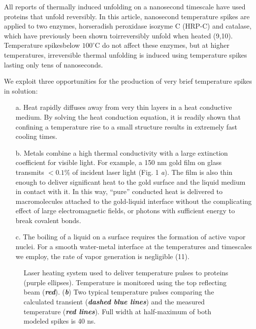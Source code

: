 \documentclass{biophys_letter}
\begin{document}
\begin{multicols}{2}
All reports of thermally induced unfolding on a nanosecond timescale have used proteins that unfold reversibly. In this article, nanosecond temperature spikes are applied to two enzymes, horseradish peroxidase isozyme C (HRP-C) and catalase, which have previously been shown to\break irreversibly unfold when heated (9,10). Temperature spikes\break below $100^\circ$C do not affect these enzymes, but at higher temperatures, irreversible thermal unfolding is induced using temperature spikes lasting only tens of nanoseconds.

We exploit three opportunities for the production of very brief temperature spikes in solution:
\begin{itemize}
\item[a.] Heat rapidly diffuses away from very thin layers in a heat conductive medium. By solving the heat conduction equation, it is readily shown that confining a temperature rise to a small structure results in extremely fast cooling times.

\item[b.] Metals combine a high thermal conductivity with a large extinction coefficient for visible light. For example, a 150 nm gold film on glass transmits $<0.1\%$ of incident laser light (Fig. 1 {\it a}). The film is also thin enough to deliver significant heat to the gold surface and the liquid medium in contact with it. In this way, ``pure'' conducted heat is delivered to macromolecules attached to the gold-liquid interface without the complicating effect of large electromagnetic fields, or photons with sufficient energy to break covalent bonds.
\end{itemize}
\doiline
\end{multicols}

\twocolumn
\begin{itemize}
\item[c.] The boiling of a liquid on a surface requires the formation of active vapor nuclei. For a smooth water-metal interface at the temperatures and timescales we employ, the rate of vapor generation is negligible (11).
\end{itemize}
\begin{figure}[t!]\vspace*{3pt}
\vspace*{-5.5pt}
\caption{Laser heating system used to deliver temperature pulses to proteins (purple ellipses). Temperature is monitored using the top reflecting beam ({\bfseries\itshape red}). ({\bfseries\itshape b}) Two typical temperature pulses comparing the calculated transient ({\bfseries\itshape dashed blue lines}) and the measured temperature ({\bfseries\itshape red lines}). Full width at half-maximum  of both modeled spikes is 40 ns.}\vspace*{-8pt}
\end{figure}
\end{document}
